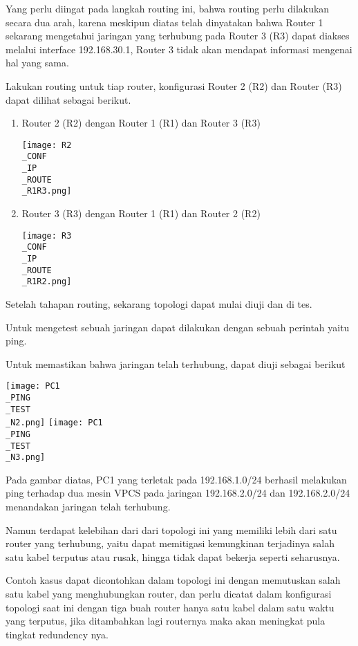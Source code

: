 \documentclass[12pt, a4paper]{article}
\begin{document}
  Yang perlu diingat pada langkah routing ini, bahwa routing perlu dilakukan
  secara dua arah, karena meskipun diatas telah dinyatakan bahwa Router 1 
  sekarang mengetahui jaringan yang terhubung pada Router 3 (R3) dapat diakses
  melalui interface 192.168.30.1, Router 3 tidak akan mendapat informasi mengenai
  hal yang sama.

  Lakukan routing untuk tiap router, konfigurasi Router 2 (R2) dan Router (R3)
  dapat dilihat sebagai berikut.

  \begin{enumerate}

    \item Router 2 (R2) dengan Router 1 (R1) dan Router 3 (R3)
          \begin{center}
            \texttt{[image: R2\\\_CONF\\\_IP\\\_ROUTE\\\_R1R3.png]}
          \end{center}

    \item Router 3 (R3) dengan Router 1 (R1) dan Router 2 (R2)
          \begin{center}
            \texttt{[image: R3\\\_CONF\\\_IP\\\_ROUTE\\\_R1R2.png]}
          \end{center}

  \end{enumerate}

  Setelah tahapan routing, sekarang topologi dapat mulai diuji dan di tes.

  Untuk mengetest sebuah jaringan dapat dilakukan dengan sebuah perintah
  yaitu ping.

  Untuk memastikan bahwa jaringan telah terhubung, dapat diuji sebagai berikut

  \begin{center}
    \texttt{[image: PC1\\\_PING\\\_TEST\\\_N2.png]}
    \texttt{[image: PC1\\\_PING\\\_TEST\\\_N3.png]}
  \end{center}

  Pada gambar diatas, PC1 yang terletak pada 192.168.1.0/24 berhasil melakukan
  ping terhadap dua mesin VPCS pada jaringan 192.168.2.0/24 dan 192.168.2.0/24
  menandakan jaringan telah terhubung.

  Namun terdapat kelebihan dari dari topologi ini yang memiliki lebih
  dari satu router yang terhubung, yaitu dapat memitigasi kemungkinan
  terjadinya salah satu kabel terputus atau rusak, hingga tidak dapat
  bekerja seperti seharusnya.

  Contoh kasus dapat dicontohkan dalam topologi ini dengan memutuskan
  salah satu kabel yang menghubungkan router,
  dan perlu dicatat dalam konfigurasi topologi saat ini dengan tiga buah
  router hanya satu kabel dalam satu waktu yang terputus, jika ditambahkan
  lagi routernya maka akan meningkat pula tingkat redundency nya.
\end{document}
